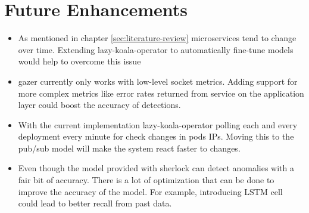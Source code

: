\section{Future Enhancements}

\begin{itemize}[noitemsep,nolistsep]
    \item As mentioned in chapter \ref{sec:literature-review} microservices tend to change over time. Extending \ac{lazy-koala-operator} to automatically fine-tune models would help to overcome this issue
    \item \ac{gazer} currently only works with low-level socket metrics. Adding support for more complex metrics like error rates returned from service on the application layer could boost the accuracy of detections.
    \item With the current implementation \ac{lazy-koala-operator} polling each and every deployment every minute for check changes in pods IPs. Moving this to the pub/sub model will make the system react faster to changes.
    \item Even though the model provided with \ac{sherlock} can detect anomalies with a fair bit of accuracy. There is a lot of optimization that can be done to improve the accuracy of the model. For example, introducing LSTM cell could lead to better recall from past data.
\end{itemize}